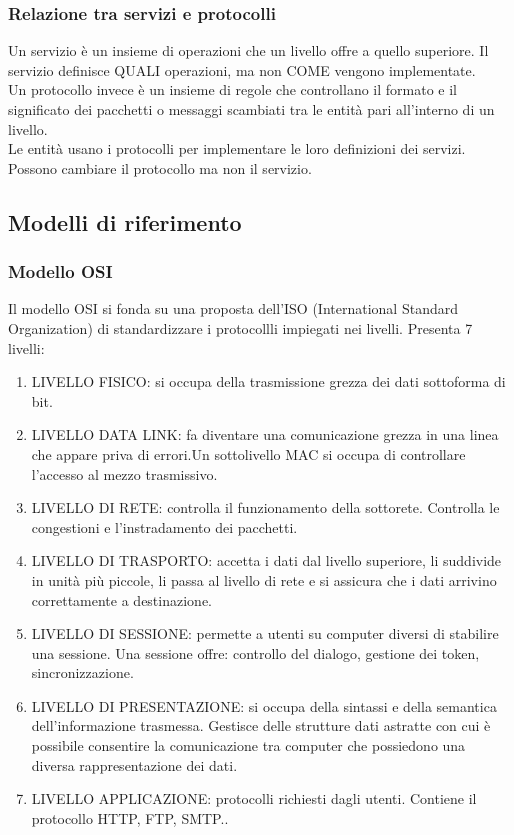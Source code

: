 \documentclass{article}
\begin{document}
			\subsubsection{Relazione tra servizi e protocolli}
			Un servizio è un insieme di operazioni che un livello offre a quello superiore. Il servizio definisce QUALI operazioni, ma non COME vengono implementate.\\
			Un protocollo invece è un insieme di regole che controllano il formato e il significato dei pacchetti o messaggi scambiati tra le entità pari all'interno di un livello. \\
			Le entità usano i protocolli per implementare le loro definizioni dei servizi. Possono cambiare il protocollo ma non il servizio. 
		\subsection{Modelli di riferimento}
			\subsubsection{Modello OSI}
			Il modello OSI si fonda su una proposta dell'ISO (International Standard Organization) di standardizzare i protocollli impiegati nei livelli. Presenta 7 livelli:
			\begin{enumerate}
				\item LIVELLO FISICO: si occupa della trasmissione grezza dei dati sottoforma di bit.
				\item LIVELLO DATA LINK: fa diventare una comunicazione grezza in una linea che appare priva di errori.Un sottolivello MAC si occupa di controllare l'accesso al mezzo trasmissivo.
				\item LIVELLO DI RETE: controlla il funzionamento della sottorete. Controlla le congestioni e l'instradamento dei pacchetti.
				\item LIVELLO DI TRASPORTO: accetta i dati dal livello superiore, li suddivide in unità più piccole, li passa al livello di rete e si assicura che i dati arrivino correttamente a destinazione. 
				\item LIVELLO DI SESSIONE: permette a utenti su computer diversi di stabilire una sessione. Una sessione offre: controllo del dialogo, gestione dei token, sincronizzazione. 
				\item LIVELLO DI PRESENTAZIONE: si occupa della sintassi e della semantica dell'informazione trasmessa. Gestisce delle strutture dati astratte con cui è possibile consentire la comunicazione tra computer che possiedono una diversa rappresentazione dei dati.
				\item LIVELLO APPLICAZIONE: protocolli richiesti dagli utenti. Contiene il protocollo HTTP, FTP, SMTP..
			\end{enumerate}	
\end{document}
